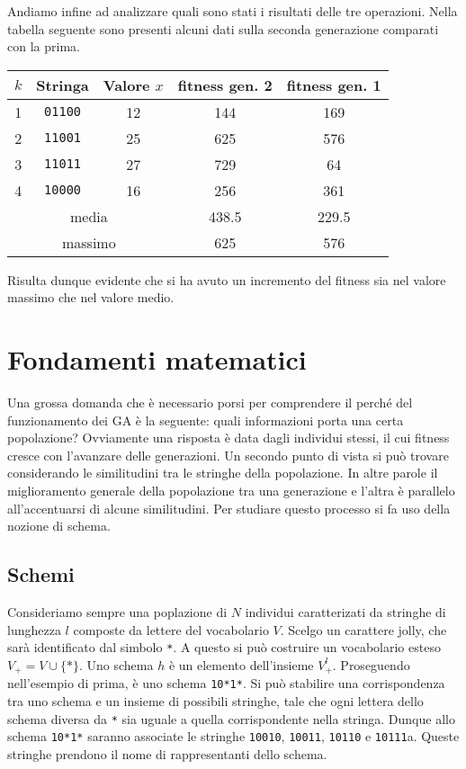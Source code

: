 \documentclass[a4paper, 11pt]{article}
\newcommand{\code}{\texttt}
\begin{document}
Andiamo infine ad analizzare quali sono stati i risultati delle tre operazioni.
Nella tabella seguente sono presenti alcuni dati sulla seconda generazione
comparati con la prima.
\begin{table}[h!]
\begin{tabular}{cccc|c}
\multicolumn{1}{c|}{$k$} & Stringa & Valore $x$ & fitness gen. 2 & fitness gen. 1 \\ \hline
\multicolumn{1}{c|}{1} & \code{01100} & 12 & 144 & 169 \\
\multicolumn{1}{c|}{2} & \code{11001} & 25 & 625 & 576 \\
\multicolumn{1}{c|}{3} & \code{11011} & 27 & 729 & 64 \\
\multicolumn{1}{c|}{4} & \code{10000} & 16 & 256 & 361 \\ \hline
\multicolumn{3}{c}{media} & 438.5 & 229.5 \\
\multicolumn{3}{c}{massimo} & 625 & 576
\end{tabular}
\end{table}

Risulta dunque evidente che si ha avuto un incremento del fitness sia nel valore
massimo che nel valore medio.




\section{Fondamenti matematici}

Una grossa domanda che è necessario porsi per comprendere il perché del
funzionamento dei GA è la seguente: quali informazioni porta una certa
popolazione? Ovviamente una risposta è data dagli individui stessi, il cui
fitness cresce con l'avanzare delle generazioni. Un secondo punto di vista si
può trovare considerando le similitudini tra le stringhe della popolazione. In
altre parole il miglioramento generale della popolazione tra una generazione e
l'altra è parallelo all'accentuarsi di alcune similitudini. Per studiare questo
processo si fa uso della nozione di schema.


\subsection{Schemi}

Consideriamo sempre una poplazione di $N$ individui caratterizati da stringhe di
lunghezza $l$ composte da lettere del vocabolario $V$. Scelgo un carattere
jolly, che sarà identificato dal simbolo \code{*}. A questo si può costruire un
vocabolario esteso $V_+=V \cup \{\code{*}\}$. Uno schema $h$ è un elemento
dell'insieme $V_+^l$. Proseguendo nell'esempio di prima, è uno schema
\code{10*1*}. Si può stabilire una corrispondenza tra uno schema e un insieme
di possibili stringhe, tale che ogni lettera dello schema diversa da \code{*}
sia uguale a quella corrispondente nella stringa. Dunque allo schema
\code{10*1*} saranno associate le stringhe \code{10010}, \code{10011},
\code{10110} e \code{10111}a. Queste stringhe prendono il nome di rappresentanti
dello schema.
\end{document}
